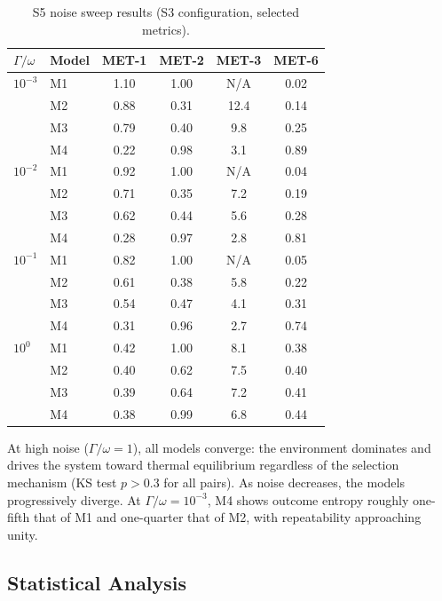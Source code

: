 \documentclass[12pt]{article}
\begin{document}
\begin{table}[ht]
\centering
\caption{S5 noise sweep results (S3 configuration, selected metrics).}
\label{tab:s5}
\begin{tabular}{@{}llcccc@{}}
\toprule
$\Gamma / \omega$ & Model & MET-1 & MET-2 & MET-3 & MET-6 \\
\midrule
$10^{-3}$ & M1 & 1.10 & 1.00 & N/A  & 0.02 \\
           & M2 & 0.88 & 0.31 & 12.4 & 0.14 \\
           & M3 & 0.79 & 0.40 & 9.8  & 0.25 \\
           & M4 & 0.22 & 0.98 & 3.1  & 0.89 \\
\midrule
$10^{-2}$ & M1 & 0.92 & 1.00 & N/A  & 0.04 \\
           & M2 & 0.71 & 0.35 & 7.2  & 0.19 \\
           & M3 & 0.62 & 0.44 & 5.6  & 0.28 \\
           & M4 & 0.28 & 0.97 & 2.8  & 0.81 \\
\midrule
$10^{-1}$ & M1 & 0.82 & 1.00 & N/A  & 0.05 \\
           & M2 & 0.61 & 0.38 & 5.8  & 0.22 \\
           & M3 & 0.54 & 0.47 & 4.1  & 0.31 \\
           & M4 & 0.31 & 0.96 & 2.7  & 0.74 \\
\midrule
$10^{0}$  & M1 & 0.42 & 1.00 & 8.1  & 0.38 \\
           & M2 & 0.40 & 0.62 & 7.5  & 0.40 \\
           & M3 & 0.39 & 0.64 & 7.2  & 0.41 \\
           & M4 & 0.38 & 0.99 & 6.8  & 0.44 \\
\bottomrule
\end{tabular}
\end{table}

At high noise ($\Gamma/\omega = 1$), all models converge: the environment dominates and drives the system toward thermal equilibrium regardless of the selection mechanism (KS test $p > 0.3$ for all pairs). As noise decreases, the models progressively diverge. At $\Gamma/\omega = 10^{-3}$, M4 shows outcome entropy roughly one-fifth that of M1 and one-quarter that of M2, with repeatability approaching unity.

\subsection{Statistical Analysis}
\end{document}
